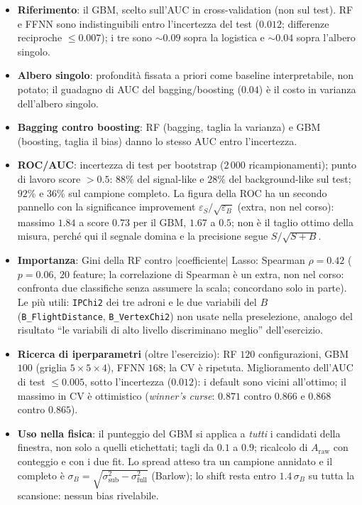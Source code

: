 \documentclass[11pt,a4paper]{article}
\newcommand{\Araw}{A_{\mathrm{raw}}}
\newcommand{\code}[1]{\texttt{#1}}
\begin{document}
\begin{itemize}
\item \textbf{Riferimento}: il GBM, scelto sull'AUC in cross-validation (non sul test). RF e FFNN sono indistinguibili entro l'incertezza del test ($0.012$; differenze reciproche $\le0.007$); i tre sono $\sim0.09$ sopra la logistica e $\sim0.04$ sopra l'albero singolo.
\item \textbf{Albero singolo}: profondit\`a fissata a priori come baseline interpretabile, non potato; il guadagno di AUC del bagging/boosting ($0.04$) \`e il costo in varianza dell'albero singolo.
\item \textbf{Bagging contro boosting}: RF (bagging, taglia la varianza) e GBM (boosting, taglia il bias) danno lo stesso AUC entro l'incertezza.
\item \textbf{ROC/AUC}: incertezza di test per bootstrap ($2\,000$ ricampionamenti); punto di lavoro score $>0.5$: $88\%$ del signal-like e $28\%$ del background-like sul test; $92\%$ e $36\%$ sul campione completo. La figura della ROC ha un secondo pannello con la significance improvement $\varepsilon_S/\sqrt{\varepsilon_B}$ (extra, non nel corso): massimo $1.84$ a score $0.73$ per il GBM, $1.67$ a $0.5$; non \`e il taglio ottimo della misura, perch\'e qui il segnale domina e la precisione segue $S/\sqrt{S+B}$.
\item \textbf{Importanza}: Gini della RF contro $|$coefficiente$|$ Lasso: Spearman $\rho=0.42$ ($p=0.06$, $20$ feature; la correlazione di Spearman \`e un extra, non nel corso: confronta due classifiche senza assumere la scala; concordano solo in parte). Le pi\`u utili: \code{IPChi2} dei tre adroni e le due variabili del $B$ (\code{B\_FlightDistance}, \code{B\_VertexChi2}) non usate nella preselezione, analogo del risultato ``le variabili di alto livello discriminano meglio'' dell'esercizio.
\item \textbf{Ricerca di iperparametri} (oltre l'esercizio): RF $120$ configurazioni, GBM $100$ (griglia $5\times5\times4$), FFNN $168$; la CV \`e ripetuta. Miglioramento dell'AUC di test $\le0.005$, sotto l'incertezza ($0.012$): i default sono vicini all'ottimo; il massimo in CV \`e ottimistico (\emph{winner's curse}: $0.871$ contro $0.866$ e $0.868$ contro $0.865$).
\item \textbf{Uso nella fisica}: il punteggio del GBM si applica a \emph{tutti} i candidati della finestra, non solo a quelli etichettati; tagli da $0.1$ a $0.9$; ricalcolo di $\Araw$ con conteggio e con i due fit. Lo spread atteso tra un campione annidato e il completo \`e $\sigma_B=\sqrt{\sigma_{\mathrm{sub}}^2-\sigma_{\mathrm{full}}^2}$ (Barlow); lo shift resta entro $1.4\,\sigma_B$ su tutta la scansione: nessun bias rivelabile.

\end{itemize}
\end{document}
